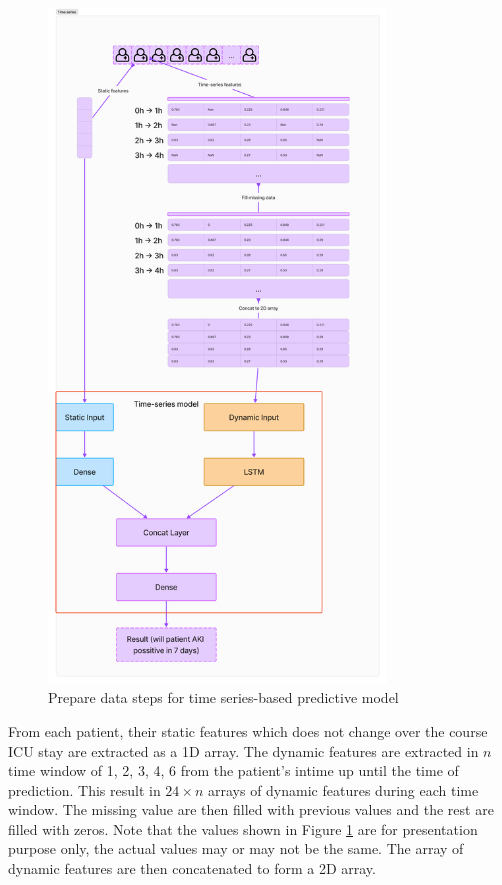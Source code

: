 \documentclass[../main.tex]{subfiles}
\begin{document}
\begin{figure}[h]
    \centering
    \includegraphics[width=0.8\textwidth]{Figure/time-series-steps.png}
    \caption{Prepare data steps for time series-based predictive model}
    \label{fig:time-series-steps}
\end{figure}

From each patient, their static features which does not change over the course ICU stay are extracted as a 1D array.
The dynamic features are extracted in $n$ time window of 1, 2, 3, 4, 6 from the patient's intime up until the time of prediction.
This result in $24 \times n$ arrays of dynamic features during each time window.
The missing value are then filled with previous values and the rest are filled with zeros.
Note that the values shown in Figure \ref{fig:time-series-steps} are for presentation purpose only, the actual values may or may not be the same.
The array of dynamic features are then concatenated to form a 2D array.
\end{document}
